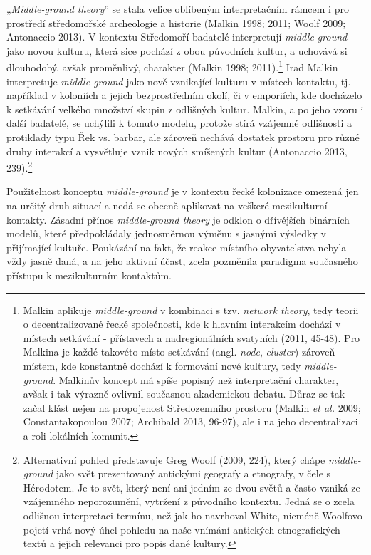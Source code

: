 „{\em Middle-ground theory}” se stala velice oblíbeným interpretačním rámcem i pro prostředí středomořské archeologie a historie (Malkin 1998; 2011; Woolf 2009; Antonaccio 2013). V kontextu Středomoří badatelé interpretují {\em middle-ground} jako novou kulturu, která sice pochází z obou původních kultur, a uchovává si dlouhodobý, avšak proměnlivý, charakter (Malkin 1998; 2011).\footnote{Malkin aplikuje {\em middle-ground} v kombinaci s tzv. {\em network theory}, tedy teorii o decentralizované řecké společnosti, kde k hlavním interakcím dochází v místech setkávání - přístavech a nadregionálních svatyních (2011, 45-48). Pro Malkina je každé takovéto místo setkávání (angl. {\em node}, {\em cluster}) zároveň místem, kde konstantně dochází k formování nové kultury, tedy {\em middle-ground}. Malkinův koncept má spíše popisný než interpretační charakter, avšak i tak výrazně ovlivnil současnou akademickou debatu. Důraz se tak začal klást nejen na propojenost Středozemního prostoru (Malkin {\em et al.} 2009; Constantakopoulou 2007; Archibald 2013, 96-97), ale i na jeho decentralizaci a roli lokálních komunit.} Irad Malkin interpretuje {\em middle-ground} jako nově vznikající kulturu v místech kontaktu, tj. například v koloniích a jejich bezprostředním okolí, či v emporiích, kde docházelo k setkávání velkého množství skupin z odlišných kultur. Malkin, a po jeho vzoru i další badatelé, se uchýlili k tomuto modelu, protože stírá vzájemné odlišnosti a protiklady typu Řek vs. barbar, ale zároveň nechává dostatek prostoru pro různé druhy interakcí a vysvětluje vznik nových smíšených kultur (Antonaccio 2013, 239).\footnote{Alternativní pohled představuje Greg Woolf (2009, 224), který chápe {\em middle-ground} jako svět prezentovaný antickými geografy a etnografy, v čele s Hérodotem. Je to svět, který není ani jedním ze dvou světů a často vzniká ze vzájemného neporozumění, vytržení z původního kontextu. Jedná se o zcela odlišnou interpretaci termínu, než jak ho navrhoval White, nicméně Woolfovo pojetí vrhá nový úhel pohledu na naše vnímání antických etnografických textů a jejich relevanci pro popis dané kultury.}

Použitelnost konceptu {\em middle-ground} je v kontextu řecké kolonizace omezená jen na určitý druh situací a nedá se obecně aplikovat na veškeré mezikulturní kontakty. Zásadní přínos {\em middle-ground theory} je odklon o dřívějších binárních modelů, které předpokládaly jednosměrnou výměnu s jasnými výsledky v přijímající kultuře. Poukázání na fakt, že reakce místního obyvatelstva nebyla vždy jasně daná, a na jeho aktivní účast, zcela pozměnila paradigma současného přístupu k mezikulturním kontaktům.

